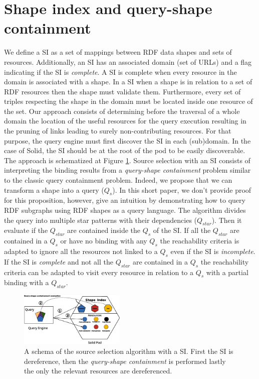 \section{Shape index and query-shape containment}

We define a SI as a set of mappings between RDF data shapes and sets of resources.
Additionally, an SI has an associated domain (set of URLs)
and a flag indicating if the SI is \emph{complete}.
A SI is complete when every resource in the domain is associated with a shape.
In a SI when a shape is in relation to a set of RDF resources then the shape must validate them.
Furthermore, every set of triples respecting the shape in the domain must be located inside one resource of the set.
Our approach consists of determining before the traversal of a whole domain the location of the useful resources for the query execution
resulting in the pruning of links leading to surely non-contributing resources.
For that purpose, the query engine must first discover the SI in each (sub)domain.
In the case of Solid, the SI should be at the root of the pod to be easily discoverable.
The approach is schematized at Figure \ref{fig:shape_index}.
Source selection with an SI consists of interpreting the binding results from a \emph{query-shape containment} problem similar to the classic query containment problem.
Indeed, we propose that we can transform a shape into a query ($Q_{s}$).
In this short paper, we don't provide proof for this proposition, however, 
\citeauthor{Delva2021} give an intuition by demonstrating how to query RDF subgraphs using RDF shapes as a query language.
The algorithm divides the query into multiple star patterns with their dependencies ($Q_{star}$).
Then it evaluate if the  $Q_{star}$ are contained inside the $Q_s$ of the SI.
If all the $Q_{star}$ are contained in a $Q_{s}$ or have no binding with any $Q_{s}$
the reachability criteria is adapted to ignore all the resources not linked to a $Q_{s}$ even if the SI is \emph{incomplete}.
If the SI is \emph{complete} and not all the $Q_{star}$ are contained in a $Q_{s}$ the reachability criteria can be adapted
to visit every resource in relation to a $Q_{s}$ with a partial binding with a $Q_{star}$.

\begin{figure}
    \centering
    \includegraphics[width=0.45\textwidth]{figure/shape_containement}
    \caption{A schema of the source selection algorithm with a SI. First the SI is dereference, 
    then the \emph{query-shape containment} is performed lastly the only the relevant resources are dereferenced.}
    \label{fig:shape_index}
\end{figure}